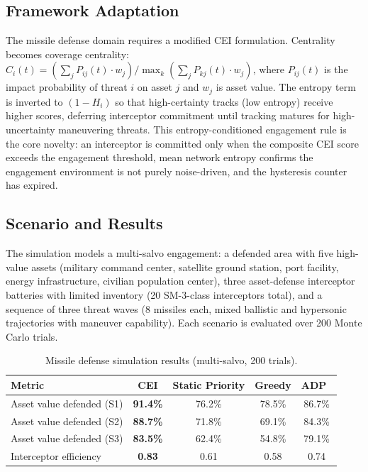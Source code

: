 \documentclass[runningheads]{llncs}
\begin{document}
\subsection{Framework Adaptation}

The missile defense domain requires a modified CEI formulation. Centrality becomes coverage centrality: $C_i(t) = (\sum_j P_{ij}(t) \cdot w_j) / \max_k(\sum_j P_{kj}(t) \cdot w_j)$, where $P_{ij}(t)$ is the impact probability of threat $i$ on asset $j$ and $w_j$ is asset value. The entropy term is inverted to $(1 - H_i)$ so that high-certainty tracks (low entropy) receive higher scores, deferring interceptor commitment until tracking matures for high-uncertainty maneuvering threats. This entropy-conditioned engagement rule is the core novelty: an interceptor is committed only when the composite CEI score exceeds the engagement threshold, mean network entropy confirms the engagement environment is not purely noise-driven, and the hysteresis counter has expired.

\subsection{Scenario and Results}

The simulation models a multi-salvo engagement: a defended area with five high-value assets (military command center, satellite ground station, port facility, energy infrastructure, civilian population center), three asset-defense interceptor batteries with limited inventory (20 SM-3-class interceptors total), and a sequence of three threat waves (8 missiles each, mixed ballistic and hypersonic trajectories with maneuver capability). Each scenario is evaluated over 200 Monte Carlo trials.

\begin{table}[ht]
\caption{Missile defense simulation results (multi-salvo, 200 trials).}
\label{tab:missile}
\centering
\small
\begin{tabular}{lcccc}
\toprule
Metric & \textbf{CEI} & Static Priority & Greedy & ADP~\cite{davis_adp} \\
\midrule
Asset value defended (S1) & \textbf{91.4\%} & 76.2\% & 78.5\% & 86.7\% \\
Asset value defended (S2) & \textbf{88.7\%} & 71.8\% & 69.1\% & 84.3\% \\
Asset value defended (S3) & \textbf{83.5\%} & 62.4\% & 54.8\% & 79.1\% \\
Interceptor efficiency    & \textbf{0.83}   & 0.61  & 0.58  & 0.74  \\
\bottomrule
\end{tabular}
\end{table}
\end{document}
